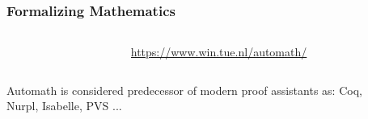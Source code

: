 \documentclass[10pt]{beamer}
\begin{document}
\begin{frame}\frametitle{Formalizing Mathematics}



\begin{columns}
\begin{column}{0.45\textwidth}
   \end{column}
\begin{column}{0.49\textwidth} \url{https://www.win.tue.nl/automath/}
\end{column}
\end{columns}

\vspace{1cm}

\begin{columns}
\begin{column}{0.4\textwidth} {\color{blue} Automath} is considered predecessor of modern
  proof assistants as: {\color{blue} Coq}, {\color{blue} Nurpl},
  {\color{blue} Isabelle}, {\color{blue} PVS} ...
\end{column}
\begin{column}{0.2\textwidth} 
\end{column}
\begin{column}{0.2\textwidth} 
\end{column}
\end{columns}


\end{frame}
\end{document}
